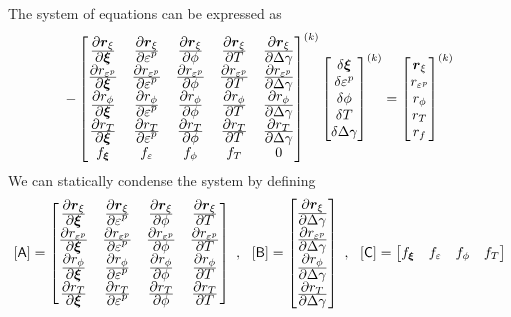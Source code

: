 The system of equations can be expressed as
\[
  -\begin{bmatrix}
    \Partial{\Br_\xi}{\Bxi} & \Partial{\Br_\xi}{\Ve^p} & 
      \Partial{\Br_\xi}{\phi} & \Partial{\Br_\xi}{T} & \Partial{\Br_\xi}{\Delta\gamma} \\
    \Partial{r_{\Ve^p}}{\Bxi} & \Partial{r_{\Ve^p}}{\Ve^p} & 
      \Partial{r_{\Ve^p}}{\phi} & \Partial{r_{\Ve^p}}{T} & \Partial{r_{\Ve^p}}{\Delta\gamma} \\
    \Partial{r_{\phi}}{\Bxi} & \Partial{r_{\phi}}{\Ve^p} & 
      \Partial{r_{\phi}}{\phi} & \Partial{r_{\phi}}{T} & \Partial{r_\phi}{\Delta\gamma} \\
    \Partial{r_{T}}{\Bxi} & \Partial{r_{T}}{\Ve^p} & 
      \Partial{r_{T}}{\phi} & \Partial{r_{T}}{T} & \Partial{r_T}{\Delta\gamma} \\
    f_{\Bxi} & f_{\Ve} & f_\phi & f_T & 0 
  \end{bmatrix}^{(k)}
  \begin{bmatrix}
    \delta\Bxi \\ \delta\Ve^p \\ \delta\phi \\ \delta T \\ \delta\Delta\gamma  
  \end{bmatrix}^{(k)} = 
  \begin{bmatrix}
    \Br_\xi \\ r_{\Ve^p} \\ r_\phi \\ r_T \\ r_f  
  \end{bmatrix}^{(k)}  
\]
We can statically condense the system by defining
\[
  \MA = \begin{bmatrix}
    \Partial{\Br_\xi}{\Bxi} & \Partial{\Br_\xi}{\Ve^p} & 
      \Partial{\Br_\xi}{\phi} & \Partial{\Br_\xi}{T} \\
    \Partial{r_{\Ve^p}}{\Bxi} & \Partial{r_{\Ve^p}}{\Ve^p} & 
      \Partial{r_{\Ve^p}}{\phi} & \Partial{r_{\Ve^p}}{T} \\
    \Partial{r_{\phi}}{\Bxi} & \Partial{r_{\phi}}{\Ve^p} & 
      \Partial{r_{\phi}}{\phi} & \Partial{r_{\phi}}{T} \\
    \Partial{r_{T}}{\Bxi} & \Partial{r_{T}}{\Ve^p} & 
      \Partial{r_{T}}{\phi} & \Partial{r_{T}}{T} 
  \end{bmatrix} ~,~~
  \MB = \begin{bmatrix}
    \Partial{\Br_\xi}{\Delta\gamma} \\
    \Partial{r_{\Ve^p}}{\Delta\gamma} \\
    \Partial{r_\phi}{\Delta\gamma} \\
    \Partial{r_T}{\Delta\gamma} 
  \end{bmatrix} ~,~~
  \MC = \begin{bmatrix}  f_{\Bxi} & f_{\Ve} & f_\phi & f_T \end{bmatrix}
\]
